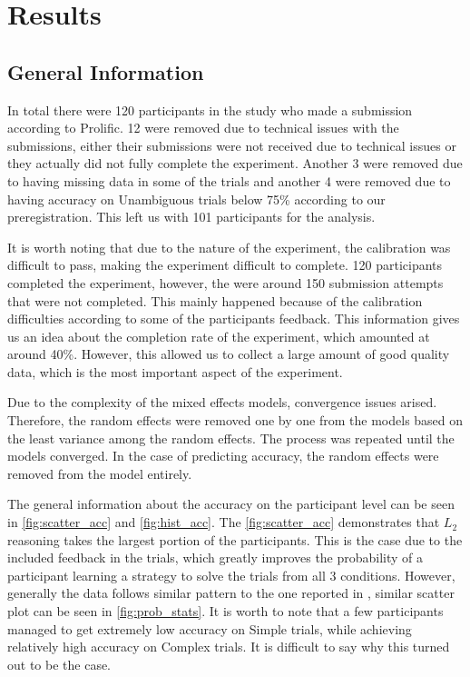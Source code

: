 ﻿\chapter{Results}
\label{chap:results}

\section{General Information}
\label{sec:general_info}
In total there were 120 participants in the study who made a submission according to Prolific. 12 were removed due to technical issues with the submissions, either their submissions were not received due to technical issues or they actually did not fully complete the experiment. Another 3 were removed due to having missing data in some of the trials and another 4 were removed due to having accuracy on Unambiguous trials below 75\% according to our preregistration. This left us with 101 participants for the analysis. 

It is worth noting that due to the nature of the experiment, the calibration was difficult to pass, making the experiment difficult to complete. 120 participants completed the experiment, however, the were around 150 submission attempts that were not completed. This mainly happened because of the calibration difficulties according to some of the participants feedback. This information gives us an idea about the completion rate of the experiment, which amounted at around 40\%. However, this allowed us to collect a large amount of good quality data, which is the most important aspect of the experiment.

Due to the complexity of the mixed effects models, convergence issues arised. Therefore, the random effects were removed one by one from the models based on the least variance among the random effects. The process was repeated until the models converged. In the case of predicting accuracy, the random effects were removed from the model entirely. 

The general information about the accuracy on the participant level can be seen in \autoref{fig:scatter_acc} and \autoref{fig:hist_acc}. The \autoref{fig:scatter_acc} demonstrates that $L_2$ reasoning takes the largest portion of the participants. This is the case due to the included feedback in the trials, which greatly improves the probability of a participant learning a strategy to solve the trials from all 3 conditions. However, generally the data follows similar pattern to the one reported in \cite{Franke_2016}, similar scatter plot can be seen in \autoref{fig:prob_stats}. It is worth to note that a few participants managed to get extremely low accuracy on Simple trials, while achieving relatively high accuracy on Complex trials. It is difficult to say why this turned out to be the case.


